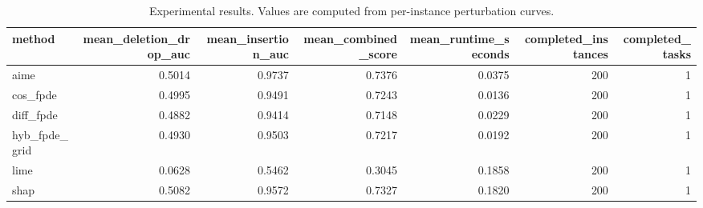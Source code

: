 \begin{table}[t]
\caption{Experimental results. Values are computed from per-instance perturbation curves.}
\label{tab:main_results_computed}
\centering
\begin{tabular}{lrrrrrr}
\toprule
method & mean\_deletion\_drop\_auc & mean\_insertion\_auc & mean\_combined\_score & mean\_runtime\_seconds & completed\_instances & completed\_tasks \\
\midrule
aime & 0.5014 & 0.9737 & 0.7376 & 0.0375 & 200 & 1 \\
cos\_fpde & 0.4995 & 0.9491 & 0.7243 & 0.0136 & 200 & 1 \\
diff\_fpde & 0.4882 & 0.9414 & 0.7148 & 0.0229 & 200 & 1 \\
hyb\_fpde\_grid & 0.4930 & 0.9503 & 0.7217 & 0.0192 & 200 & 1 \\
lime & 0.0628 & 0.5462 & 0.3045 & 0.1858 & 200 & 1 \\
shap & 0.5082 & 0.9572 & 0.7327 & 0.1820 & 200 & 1 \\
\bottomrule
\end{tabular}

\end{table}
